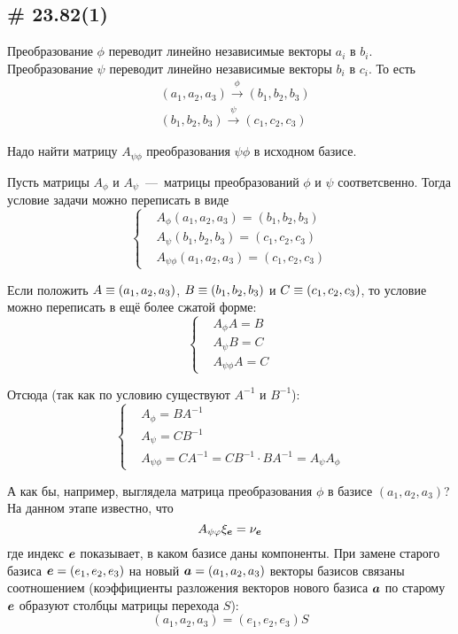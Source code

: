 \documentclass[a4paper,12pt]{article}
\begin{document}
  
  \subsection{\# 23.82(1)}
  
  Преобразование $\phi$ переводит линейно независимые векторы $a_i$ в $b_i$.
  Преобразование $\psi$ переводит линейно независимые векторы $b_i$ в $c_i$.
  То есть
  \[
    \begin{aligned}
      &(a_1, a_2, a_3) \xrightarrow{\phi} (b_1, b_2, b_3)\\
      &(b_1, b_2, b_3) \xrightarrow{\psi} (c_1, c_2, c_3)
    \end{aligned}
  \]
  
  Надо найти матрицу $A_{\psi\phi}$ преобразования $\psi\phi$ в исходном базисе.
  
  \begin{solution}
    Пусть матрицы $A_{\phi}$ и $A_{\psi}$~---~матрицы преобразований $\phi$ и $\psi$ соответсвенно.
    Тогда условие задачи можно переписать в виде
    \[
      \left\{
        \begin{aligned}
          &A_{\phi} (a_1, a_2, a_3) = (b_1, b_2, b_3)\\
          &A_{\psi} (b_1, b_2, b_3) = (c_1, c_2, c_3)\\
          &A_{\psi\phi} (a_1, a_2, a_3) = (c_1, c_2, c_3)
        \end{aligned}
      \right.
    \]
    
    Если положить $A \hm\equiv (a_1, a_2, a_3)$, $B \hm\equiv (b_1, b_2, b_3)$ и $C \hm\equiv (c_1, c_2, c_3)$, то условие можно переписать в ещё более сжатой форме:
    \[
      \left\{
        \begin{aligned}
          &A_{\phi} A = B\\
          &A_{\psi} B = C\\
          &A_{\psi\phi} A = C
        \end{aligned}
      \right.
    \]
    
    Отсюда (так как по условию существуют $A^{-1}$ и $B^{-1}$):
    \[
      \left\{
        \begin{aligned}
          &A_{\phi} = B A^{-1}\\
          &A_{\psi} = C B^{-1}\\
          &A_{\psi \phi} = C A^{-1} = CB^{-1} \cdot B A^{-1} = A_{\psi} A_{\phi}
        \end{aligned}
      \right.
    \]
    
    А как бы, например, выглядела матрица преобразования $\phi$ в базисе $(a_1, a_2, a_3)$?
    На данном этапе известно, что
    \[
      A_{\psi\varphi} \xi_{\boldsymbol e} = \nu_{\boldsymbol e}
    \]
    где индекс $\boldsymbol e$ показывает, в каком базисе даны компоненты.
    При замене старого базиса $\bds e \hm= (e_1, e_2, e_3)$ на новый $\bds a \hm= (a_1, a_2, a_3)$ векторы базисов связаны соотношением (коэффициенты разложения векторов нового базиса $\boldsymbol a$ по старому $\boldsymbol e$ образуют столбцы матрицы перехода $S$):
    \[
      (a_1, a_2, a_3) = (e_1, e_2, e_3) S
    \]
    

\end{solution}
\end{document}
